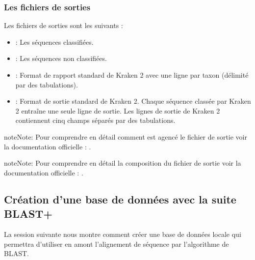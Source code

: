 \documentclass[letterpaper,10pt,french]{sphinxmanual}
\begin{document}
\subsubsection{Les fichiers de sorties}
\label{\detokenize{tutorial:id30}}
Les fichiers de sorties sont les suivants :
\begin{itemize}
\item {} 
 : Les séquences classifiées.

\item {} 
 : Les séquences non classifiées.

\item {} 
 : Format de rapport standard de Kraken 2 avec une ligne par taxon (délimité par des tabulations).

\item {} 
 : Format de sortie standard de Kraken 2. Chaque séquence classée par Kraken 2 entraîne une seule ligne de sortie. Les lignes de sortie de Kraken 2 contiennent cinq champs séparés par des tabulations.

\end{itemize}

\begin{sphinxadmonition}{note}{Note:}
Pour comprendre en détail comment est agencé le fichier de sortie  voir la documentation officielle :  .
\end{sphinxadmonition}

\begin{sphinxadmonition}{note}{Note:}
Pour comprendre en détail la composition du fichier de sortie  voir la documentation officielle :  .
\end{sphinxadmonition}


\subsection{Création d’une base de données avec la suite BLAST+}
\label{\detokenize{tutorial:creation-d-une-base-de-donnees-avec-la-suite-blast}}\label{\detokenize{tutorial:creation-database-blast}}
La session suivante nous montre comment créer une base de données locale qui permettra d’utiliser en amont l’alignement de séquence par l’algorithme de BLAST.
\end{document}
